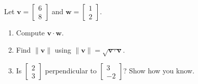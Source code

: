 \documentclass[10pt]{article}
\newcommand{\vv}{\mathbf{v}}
\newcommand{\ww}{\mathbf{w}}
\begin{document}
\boxguard
\begin{practicebox}
Let $\vv = \begin{bmatrix} 6 \\ 8 \end{bmatrix}$ and $\ww = \begin{bmatrix} 1 \\ 2 \end{bmatrix}$.
\begin{enumerate}[leftmargin=1.6em]
  \item Compute $\vv\cdot\ww$. \hfill {}
  \item Find $\|\vv\|$ using $\|\vv\|=\sqrt{\vv\cdot\vv}$. \hfill {}
  \item Is $\begin{bmatrix} 2 \\ 3 \end{bmatrix}$ perpendicular to $\begin{bmatrix} 3 \\ -2 \end{bmatrix}$?
        Show how you know. 
\end{enumerate}
\end{practicebox}
\end{document}
